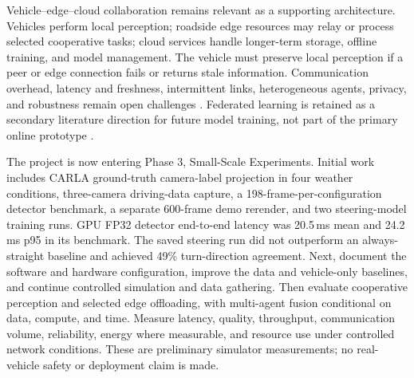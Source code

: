 \documentclass[12pt,a4paper,oneside]{report}
\begin{document}
Vehicle--edge--cloud collaboration remains relevant as a supporting
architecture. Vehicles perform local perception; roadside edge resources
may relay or process selected cooperative tasks; cloud services handle
longer-term storage, offline training, and model management. The vehicle
must preserve local perception if a peer or edge connection fails or
returns stale information. Communication overhead, latency and freshness,
intermittent links, heterogeneous agents, privacy, and robustness remain
open challenges \cite{v2xsurvey2025,biswas2023}. Federated learning is
retained as a secondary literature direction for future model training,
not part of the primary online prototype \cite{flcav2024}.

The project is now entering Phase 3, Small-Scale Experiments. Initial work
includes CARLA ground-truth camera-label projection in four weather
conditions, three-camera driving-data capture, a 198-frame-per-configuration
detector benchmark, a separate 600-frame demo rerender, and two
steering-model training runs. GPU FP32 detector end-to-end latency was
20.5\,ms mean and 24.2\,ms p95 in its benchmark. The saved steering run did
not outperform an always-straight baseline and achieved 49\% turn-direction
agreement. Next, document the software and hardware configuration, improve
the data and vehicle-only baselines, and continue controlled simulation and
data gathering. Then evaluate cooperative perception and selected edge
offloading, with multi-agent fusion conditional on data, compute, and time.
Measure latency, quality, throughput, communication volume, reliability,
energy where measurable, and resource use under controlled network
conditions. These are preliminary simulator measurements; no real-vehicle
safety or deployment claim is made.
\end{document}
